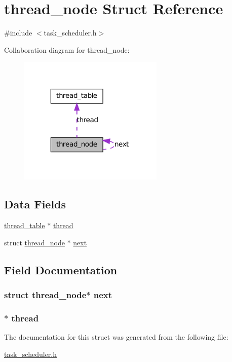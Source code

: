 \hypertarget{structthread__node}{
\section{thread\_\-node Struct Reference}
\label{structthread__node}
}


{\ttfamily \#include $<$task\_\-scheduler.h$>$}



Collaboration diagram for thread\_\-node:\nopagebreak
\begin{figure}[H]
\begin{center}
\leavevmode
\includegraphics[width=196pt]{structthread__node__coll__graph}
\end{center}
\end{figure}
\subsection*{Data Fields}
\begin{DoxyCompactItemize}
\item 
\hyperlink{structthread__table}{thread\_\-table} $\ast$ \hyperlink{structthread__node_ae52e1333aac15af28b6c73736a95c1b2}{thread}
\item 
struct \hyperlink{structthread__node}{thread\_\-node} $\ast$ \hyperlink{structthread__node_a051ce7e25364ca47a00f5f1bc1e3eaf5}{next}
\end{DoxyCompactItemize}


\subsection{Field Documentation}
\hypertarget{structthread__node_a051ce7e25364ca47a00f5f1bc1e3eaf5}{
\subsubsection[{next}]{\setlength{\rightskip}{0pt plus 5cm}struct {\bf thread\_\-node}$\ast$ {\bf next}}}
\label{structthread__node_a051ce7e25364ca47a00f5f1bc1e3eaf5}
\hypertarget{structthread__node_ae52e1333aac15af28b6c73736a95c1b2}{
\subsubsection[{thread}]{$\ast$ {\bf thread}}}
\label{structthread__node_ae52e1333aac15af28b6c73736a95c1b2}


The documentation for this struct was generated from the following file:\begin{DoxyCompactItemize}
\item 
\hyperlink{task__scheduler_8h}{task\_\-scheduler.h}\end{DoxyCompactItemize}
